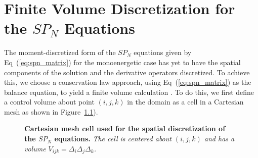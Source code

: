 \chapter{Finite Volume Discretization for the $SP_N$ Equations\ }
\label{chap:spn_spatial_discretization}
The moment-discretized form of the $SP_N$ equations given by
Eq~(\ref{eq:spn_matrix}) for the monoenergetic case has yet to have
the spatial components of the solution and the derivative operators
discretized. To achieve this, we choose a conservation law approach,
using Eq~(\ref{eq:spn_matrix}) as the balance equation, to yield a
finite volume calculation \citep{leveque_finite_2002}. To do this, we
first define a control volume about point $(i,j,k)$ in the domain as a
cell in a Cartesian mesh as shown in Figure~\ref{fig:mesh_cell}).
\begin{figure}[h!]
  \begin{center}
    \scalebox{1.5}{
     }
  \end{center}
  \caption{\textbf{Cartesian mesh cell used for the spatial
      discretization of the $SP_N$ equations.} \textit{The cell is
      centered about $(i,j,k)$ and has a volume $V_{ijk} = \Delta_i
      \Delta_j \Delta_k$.}}
  \label{fig:mesh_cell}
\end{figure}

